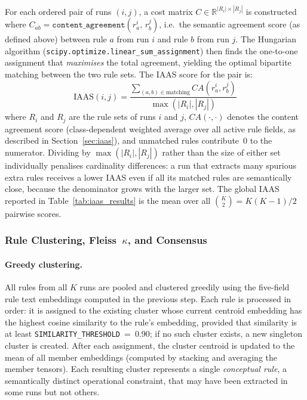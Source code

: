 ﻿\documentclass[11pt]{article}
\begin{document}
For each ordered pair of runs $(i, j)$, a cost matrix
$C \in \mathbb{R}^{|R_i| \times |R_j|}$ is constructed where
$C_{ab} = \texttt{content\_agreement}(r^i_a,\, r^j_b)$, i.e.\ the semantic
agreement score (as defined above) between rule $a$ from run $i$ and rule $b$
from run $j$.
The Hungarian algorithm (\texttt{scipy.optimize.linear\_sum\_assignment}) then
finds the one-to-one assignment that \emph{maximises} the total agreement,
yielding the optimal bipartite matching between the two rule sets.
The IAAS score for the pair is:
\begin{equation}
\text{IAAS}(i,j) = \frac{\sum_{(a,b) \in \text{matching}} CA(r^i_a, r^j_b)}
                        {\max(|R_i|, |R_j|)}
\label{eq:iaas_pairwise}
\end{equation}
where $R_i$ and $R_j$ are the rule sets of runs $i$ and $j$,
$CA(\cdot,\cdot)$ denotes the content agreement score (class-dependent weighted
average over all active rule fields, as described in Section~\ref{sec:iaas}),
and unmatched rules contribute~0 to the numerator.
Dividing by $\max(|R_i|, |R_j|)$ rather than the size of either set
individually penalises cardinality differences: a run that extracts many
spurious extra rules receives a lower IAAS even if all its matched rules are
semantically close, because the denominator grows with the larger set.
The global IAAS reported in Table~\ref{tab:iaas_results} is the mean over all
$\binom{K}{2} = K(K{-}1)/2$ pairwise scores.

\subsubsection{Rule Clustering, Fleiss~$\kappa$, and Consensus}

\paragraph{Greedy clustering.}
All rules from all $K$ runs are pooled and clustered greedily using the
five-field rule text embeddings computed in the previous step.
Each rule is processed in order: it is assigned to the existing cluster whose
current centroid embedding has the highest cosine similarity to the rule's
embedding, provided that similarity is at least
\texttt{SIMILARITY\_THRESHOLD}~=~0.90; if no such cluster exists, a new
singleton cluster is created.
After each assignment, the cluster centroid is updated to the mean of all
member embeddings (computed by stacking and averaging the member tensors).
Each resulting cluster represents a single \emph{conceptual rule}, a
semantically distinct operational constraint, that may have been extracted
in some runs but not others.
\end{document}
